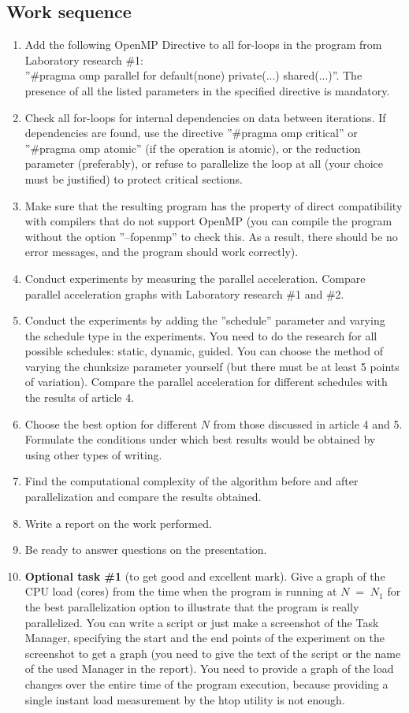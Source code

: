 { %
	\subsection{Work sequence}
	\begin{enumerate}
		\item Add the following OpenMP Directive to all for-loops in the program from Laboratory research \#1: \\	
''\#pragma omp parallel for default(none) private(...) shared(...)''. The presence of all the listed parameters in the specified directive is mandatory.
		\item Check all for-loops for internal dependencies on data between iterations. If dependencies are found, use the directive ''\#pragma omp critical'' or ''\#pragma omp atomic'' (if the operation is atomic), or the reduction parameter (preferably), or refuse to parallelize the loop at all (your choice must be justified) to protect critical sections.
		\item Make sure that the resulting program has the property of direct compatibility with compilers that do not support OpenMP (you can compile the program without the option ''–fopenmp'' to check this. As a result, there should be no error messages, and the program should work correctly).
		\item Conduct experiments by measuring the parallel acceleration. Compare parallel acceleration graphs with Laboratory research \#1 and \#2.
		\item Conduct the experiments by adding the ''schedule'' parameter and varying the schedule type in the experiments. You need to do the research for all possible schedules: static, dynamic, guided. You can choose the method of varying the chunk\textunderscore size parameter yourself (but there must be at least 5 points of variation). Compare the parallel acceleration for different schedules with the results of article 4.
		\item Choose the best option for different $N$ from those discussed in article 4 and 5. Formulate the conditions under which best results would be obtained by using other types of writing.
		\item Find the computational complexity of the algorithm before and after parallelization and compare the results obtained.
		\item Write a report on the work performed.
		\item Be ready to answer questions on the presentation.
		\item\textbf{Optional task \#1} (to get good and excellent mark). Give a graph of the CPU load (cores) from the time when the program is running at $N\;=\;N_1$ for the best parallelization option to illustrate that the program is really parallelized. You can write a script or just make a screenshot of the Task Manager, specifying the start and the end points of the experiment on the screenshot to get a graph (you need to give the text of the script or the name of the used Manager in the report). You need to provide a graph of the load changes over the entire time of the program execution, because providing a single instant load measurement by the htop utility is not enough.

\end{enumerate}}
